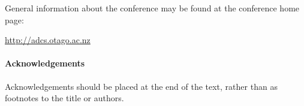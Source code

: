 \documentclass[twocolumn]{article}
\begin{document}
General information about the conference may be found at the
conference home page: 

\begin{center}
\url{http://adcs.otago.ac.nz}
\end{center}

\paragraph*{Acknowledgements}

Acknowledgements should be placed at the end of the text, rather than
as footnotes to the title or authors.

\begin{small}

\end{small}
\end{document}
